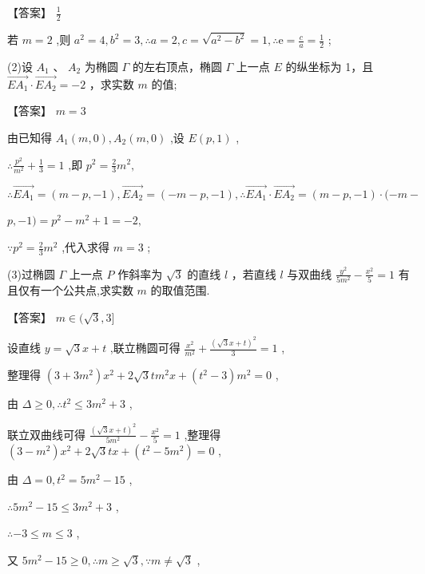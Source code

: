 \documentclass[10pt]{article}
\begin{document}
【答案】 \(\frac{1}{2}\)

若 \(m = 2\) ,则 \({a}^{2} = 4,{b}^{2} = 3,\therefore a = 2,c = \sqrt{{a}^{2} - {b}^{2}} = 1,\therefore \mathrm{e} = \frac{c}{a} = \frac{1}{2}\) ;

(2)设 \({A}_{1}\) 、 \({A}_{2}\) 为椭圆 \(\Gamma\) 的左右顶点，椭圆 \(\Gamma\) 上一点 \(E\) 的纵坐标为 1，且 \(\overrightarrow{E{A}_{1}} \cdot  \overrightarrow{E{A}_{2}} =  - 2\) ，求实数 \(m\) 的值;

【答案】 \(m = 3\)

由已知得 \({A}_{1}\left( {m,0}\right) ,{A}_{2}\left( {m,0}\right)\) ,设 \(E\left( {p,1}\right)\) ,

\(\therefore \frac{{p}^{2}}{{m}^{2}} + \frac{1}{3} = 1\) ,即 \({p}^{2} = \frac{2}{3}{m}^{2},\)

\(\therefore \overrightarrow{E{A}_{1}} = \left( {m - p, - 1}\right) ,\overrightarrow{E{A}_{2}} = \left( {-m - p, - 1}\right) ,\therefore \overrightarrow{E{A}_{1}} \cdot  \overrightarrow{E{A}_{2}} = \left( {m - p, - 1}\right)  \cdot  ( - m -\)

\(p, - 1) = {p}^{2} - {m}^{2} + 1 =  - 2,\)

\(\because {p}^{2} = \frac{2}{3}{m}^{2}\) ,代入求得 \(m = 3\) ;

(3)过椭圆 \(\Gamma\) 上一点 \(P\) 作斜率为 \(\sqrt{3}\) 的直线 \(l\) ，若直线 \(l\) 与双曲线 \(\frac{{y}^{2}}{5{m}^{2}} - \frac{{x}^{2}}{5} = 1\) 有且仅有一个公共点,求实数 \(m\) 的取值范围.

【答案】 \(m \in  (\sqrt{3},3\rbrack\)

设直线 \(y = \sqrt{3}x + t\) ,联立椭圆可得 \(\frac{{x}^{2}}{{m}^{2}} + \frac{{\left( \sqrt{3}x + t\right) }^{2}}{3} = 1\) ,

整理得 \(\left( {3 + 3{m}^{2}}\right) {x}^{2} + 2\sqrt{3}t{m}^{2}x + \left( {{t}^{2} - 3}\right) {m}^{2} = 0\) ,

由 \(\Delta  \geq  0,\therefore {t}^{2} \leq  3{m}^{2} + 3\) ,

联立双曲线可得 \(\frac{{\left( \sqrt{3}x + t\right) }^{2}}{5{m}^{2}} - \frac{{x}^{2}}{5} = 1\) ,整理得 \(\left( {3 - {m}^{2}}\right) {x}^{2} + 2\sqrt{3}{tx} + \left( {{t}^{2} - 5{m}^{2}}\right)  = 0\) ,

由 \(\Delta  = 0,{t}^{2} = 5{m}^{2} - {15}\) ,

\(\therefore 5{m}^{2} - {15} \leq  3{m}^{2} + 3\) ,

\(\therefore  - 3 \leq  m \leq  3\) ,

又 \(5{m}^{2} - {15} \geq  0,\therefore m \geq  \sqrt{3},\because m \neq  \sqrt{3}\) ,
\end{document}
